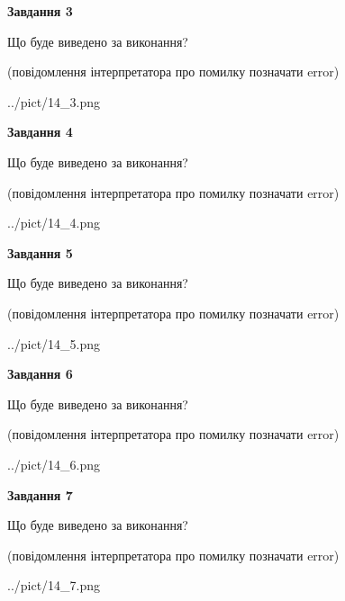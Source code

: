 \documentclass[12pt, ukrainian]{article}
\begin{document}
{\begin {large}
{\begin {center}\textbf{Завдання 3}\end {center}}\par
Що буде виведено за виконання?\par
 (повідомлення інтерпретатора про помилку позначати error)\par
\begin{center}
	{../pict/14_3.png}
\end{center}
\newpage

{\begin {center}\textbf{Завдання 4}\end {center}}\par
Що буде виведено за виконання?\par
 (повідомлення інтерпретатора про помилку позначати error)\par
\begin{center}
	{../pict/14_4.png}
\end{center}
\newpage

{\begin {center}\textbf{Завдання 5}\end {center}}\par
Що буде виведено за виконання?\par
 (повідомлення інтерпретатора про помилку позначати error)\par
\begin{center}
	{../pict/14_5.png}
\end{center}
\newpage

{\begin {center}\textbf{Завдання 6}\end {center}}\par
Що буде виведено за виконання?\par
 (повідомлення інтерпретатора про помилку позначати error)\par
\begin{center}
	{../pict/14_6.png}
\end{center}
\newpage

{\begin {center}\textbf{Завдання 7}\end {center}}\par
Що буде виведено за виконання?\par
 (повідомлення інтерпретатора про помилку позначати error)\par
\begin{center}
	{../pict/14_7.png}
\end{center}
\newpage


\end{large}}
\end{document}

